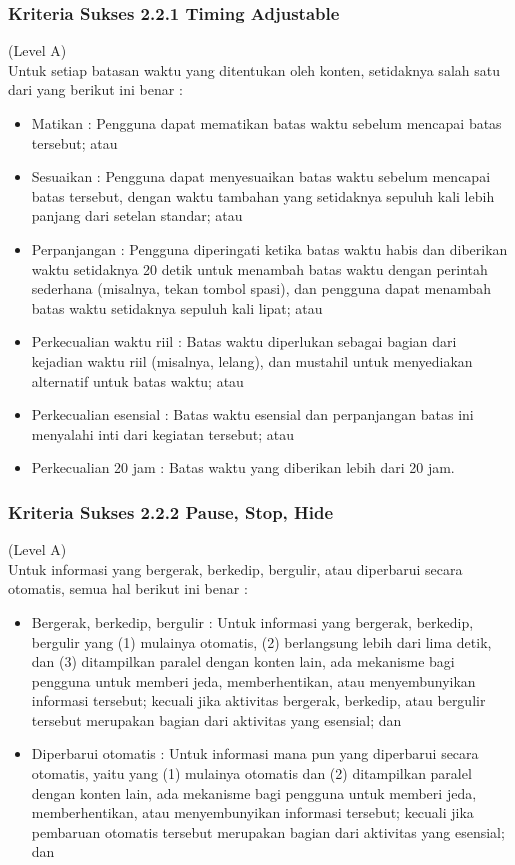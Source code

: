 \subsubsection{Kriteria Sukses 2.2.1 Timing Adjustable}
\label{subsubsec:kriteria_2.2.1}
(Level A) \\

Untuk setiap batasan waktu yang ditentukan oleh konten, setidaknya salah satu dari yang berikut ini benar :

\begin{itemize}
	\item Matikan : Pengguna dapat mematikan batas waktu sebelum mencapai batas tersebut; atau
	\item Sesuaikan : Pengguna dapat menyesuaikan batas waktu sebelum mencapai batas tersebut, dengan waktu tambahan yang setidaknya sepuluh kali lebih panjang dari setelan standar; atau
	\item Perpanjangan : Pengguna diperingati ketika batas waktu habis dan diberikan waktu setidaknya 20 detik untuk menambah batas waktu dengan perintah sederhana (misalnya, tekan tombol spasi), dan pengguna dapat menambah batas waktu setidaknya sepuluh kali lipat; atau
	\item Perkecualian waktu riil : Batas waktu diperlukan sebagai bagian dari kejadian waktu riil (misalnya, lelang), dan mustahil untuk menyediakan alternatif untuk batas waktu; atau
	\item Perkecualian esensial : Batas waktu esensial dan perpanjangan batas ini menyalahi inti dari kegiatan tersebut; atau
	\item Perkecualian 20 jam : Batas waktu yang diberikan lebih dari 20 jam.
\end{itemize}

\subsubsection{Kriteria Sukses 2.2.2 Pause, Stop, Hide}
\label{subsubsec:kriteria_2.2.2}
(Level A) \\

Untuk informasi yang bergerak, berkedip, bergulir, atau diperbarui secara otomatis, semua hal berikut ini benar :

\begin{itemize}
	\item Bergerak, berkedip, bergulir : Untuk informasi yang bergerak, berkedip, bergulir yang (1) mulainya otomatis, (2) berlangsung lebih dari lima detik, dan (3) ditampilkan paralel dengan konten lain, ada mekanisme bagi pengguna untuk memberi jeda, memberhentikan, atau menyembunyikan informasi tersebut; kecuali jika aktivitas bergerak, berkedip, atau bergulir tersebut merupakan bagian dari aktivitas yang esensial; dan
	\item Diperbarui otomatis : Untuk informasi mana pun yang diperbarui secara otomatis, yaitu yang (1) mulainya otomatis dan (2) ditampilkan paralel dengan konten lain, ada mekanisme bagi pengguna untuk memberi jeda, memberhentikan, atau menyembunyikan informasi tersebut; kecuali jika pembaruan otomatis tersebut merupakan bagian dari aktivitas yang esensial; dan
\end{itemize}

